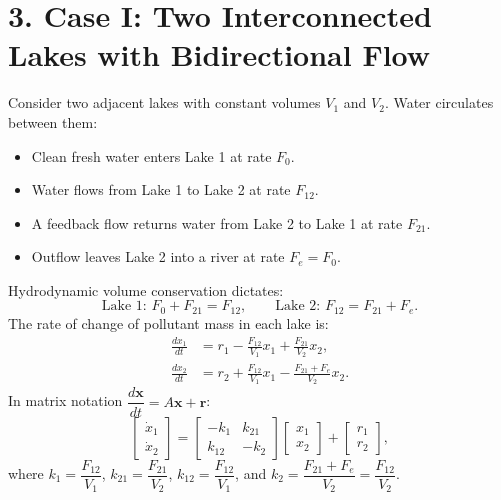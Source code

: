 \documentclass[12pt]{article}
\begin{document}
\vspace{10pt}

\section{3. Case I: Two Interconnected Lakes with Bidirectional Flow}

Consider two adjacent lakes with constant volumes $V_1$ and $V_2$. Water circulates between them:
\begin{itemize}[itemsep=2pt]
  \item Clean fresh water enters Lake 1 at rate $F_0$.
  \item Water flows from Lake 1 to Lake 2 at rate $F_{12}$.
  \item A feedback flow returns water from Lake 2 to Lake 1 at rate $F_{21}$.
  \item Outflow leaves Lake 2 into a river at rate $F_e = F_0$.
\end{itemize}

\begin{derivbox}
Hydrodynamic volume conservation dictates:
\[
  \text{Lake 1: } F_0 + F_{21} = F_{12}, \qquad \text{Lake 2: } F_{12} = F_{21} + F_e.
\]
The rate of change of pollutant mass in each lake is:
\begin{align}
  \frac{dx_1}{dt} &= r_1 - \frac{F_{12}}{V_1}x_1 + \frac{F_{21}}{V_2}x_2, \\
  \frac{dx_2}{dt} &= r_2 + \frac{F_{12}}{V_1}x_1 - \frac{F_{21} + F_e}{V_2}x_2.
\end{align}
In matrix notation $\dfrac{d\mathbf{x}}{dt} = A\mathbf{x} + \mathbf{r}$:
\begin{equation}
  \begin{bmatrix} \dot{x}_1 \\ \dot{x}_2 \end{bmatrix} =
  \begin{bmatrix}
    -k_1 & k_{21} \\
    k_{12} & -k_2
  \end{bmatrix}
  \begin{bmatrix} x_1 \\ x_2 \end{bmatrix} +
  \begin{bmatrix} r_1 \\ r_2 \end{bmatrix},
\end{equation}
where $k_1 = \dfrac{F_{12}}{V_1}$, $k_{21} = \dfrac{F_{21}}{V_2}$, $k_{12} = \dfrac{F_{12}}{V_1}$, and $k_2 = \dfrac{F_{21} + F_e}{V_2} = \dfrac{F_{12}}{V_2}$.
\end{derivbox}
\end{document}
